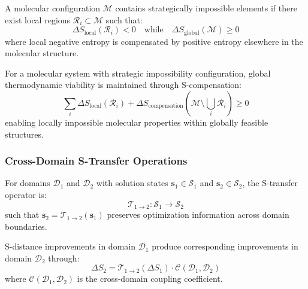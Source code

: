 \documentclass[11pt,a4paper]{article}
\begin{document}
\begin{definition}
A molecular configuration $\mathcal{M}$ contains strategically impossible elements if there exist local regions $\mathcal{R}_i \subset \mathcal{M}$ such that:
\begin{equation}
\Delta S_{\text{local}}(\mathcal{R}_i) < 0 \quad \text{while} \quad \Delta S_{\text{global}}(\mathcal{M}) \geq 0
\end{equation}
where local negative entropy is compensated by positive entropy elsewhere in the molecular structure.
\end{definition}

\begin{theorem}
For a molecular system with strategic impossibility configuration, global thermodynamic viability is maintained through S-compensation:
\begin{equation}
\sum_{i} \Delta S_{\text{local}}(\mathcal{R}_i) + \Delta S_{\text{compensation}}(\mathcal{M} \setminus \bigcup_i \mathcal{R}_i) \geq 0
\end{equation}
enabling locally impossible molecular properties within globally feasible structures.
\end{theorem}

\subsubsection{Cross-Domain S-Transfer Operations}

\begin{definition}
For domains $\mathcal{D}_1$ and $\mathcal{D}_2$ with solution states $\mathbf{s}_1 \in \mathcal{S}_1$ and $\mathbf{s}_2 \in \mathcal{S}_2$, the S-transfer operator is:
\begin{equation}
\mathcal{T}_{1 \to 2}: \mathcal{S}_1 \to \mathcal{S}_2
\end{equation}
such that $\mathbf{s}_2 = \mathcal{T}_{1 \to 2}(\mathbf{s}_1)$ preserves optimization information across domain boundaries.
\end{definition}

\begin{theorem}
S-distance improvements in domain $\mathcal{D}_1$ produce corresponding improvements in domain $\mathcal{D}_2$ through:
\begin{equation}
\Delta S_2 = \mathcal{T}_{1 \to 2}(\Delta S_1) \cdot \mathcal{C}(\mathcal{D}_1, \mathcal{D}_2)
\end{equation}
where $\mathcal{C}(\mathcal{D}_1, \mathcal{D}_2)$ is the cross-domain coupling coefficient.
\end{theorem}
\end{document}
